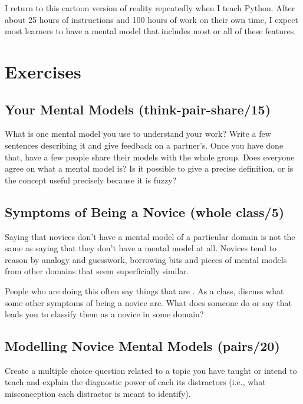 I return to this cartoon version of reality repeatedly when I teach Python.
After about 25 hours of instructions and 100 hours of work on their own time,
I expect most learners to have a mental model
that includes most or all of these features.

\section{Exercises}\label{s:models-exercises}

\subsection*{Your Mental Models (think-pair-share/15)}

What is one mental model you use to understand your work?
Write a few sentences describing it and give feedback on a partner's.
Once you have done that,
have a few people share their models with the whole group.
Does everyone agree on what a mental model is?
Is it possible to give a precise definition,
or is the concept useful precisely because it is fuzzy?

\subsection*{Symptoms of Being a Novice (whole class/5)}

Saying that novices don't have a mental model of a particular domain
is not the same as saying that they don't have a mental model at all.
Novices tend to reason by analogy and guesswork,
borrowing bits and pieces of mental models from other domains that seem superficially similar.

People who are doing this often say things that are
.
As a class,
discuss what some other symptoms of being a novice are.
What does someone do or say that leads you to classify them as a novice in some domain?

\subsection*{Modelling Novice Mental Models (pairs/20)}

Create a multiple choice question related to a topic you have taught
or intend to teach
and explain the diagnostic power of each its distractors
(i.e., what misconception each distractor is meant to identify).

